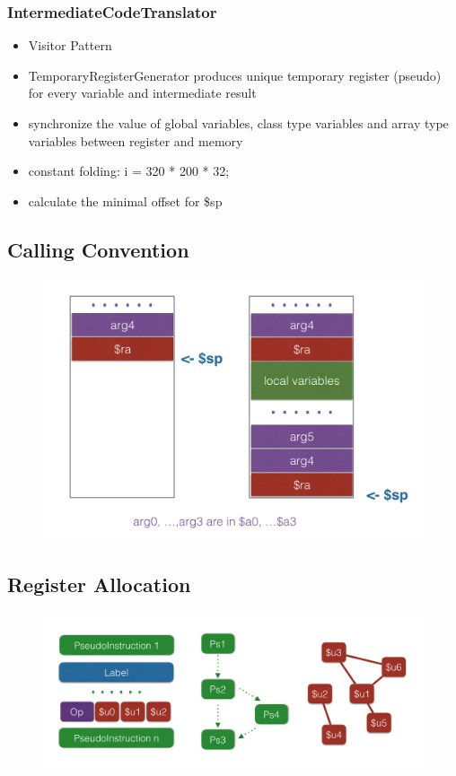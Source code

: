 \documentclass{beamer}
\begin{document}
\begin{frame}\frametitle{IntermediateCodeTranslator}
	\begin{itemize}
		\item Visitor Pattern
		\item TemporaryRegisterGenerator produces unique temporary register (pseudo) for every variable and intermediate result
		\item synchronize the value of global variables, class type variables and array type variables between register and memory
		\item constant folding: i = 320 * 200 * 32;
		\item calculate the minimal offset for \$sp
	\end{itemize}
\end{frame}

\subsection{Calling Convention}
\begin{frame}
	\begin{figure}
		\centering
		\includegraphics[width = \textwidth]{cc_1}
	\end{figure}
\end{frame}

\subsection{Register Allocation}
\begin{frame}
	\begin{figure}
		\centering
		\includegraphics[width = \textwidth]{ra_1}
	\end{figure}
\end{frame}
\end{document}
